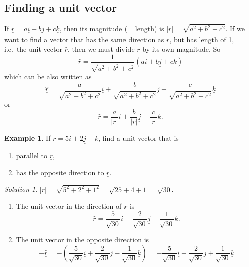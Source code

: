 \documentclass[
  english,
  11pt,
  oneside]{book}
\providecommand{\tightlist}{%
  \setlength{\itemsep}{0pt}\setlength{\parskip}{0pt}}
\newcommand{\slide}{}
\theoremstyle{definition}
\theoremstyle{definition}
\newtheorem{example}{Example}[chapter]
\theoremstyle{definition}
\theoremstyle{definition}
\theoremstyle{remark}
\newtheorem*{solution}{Solution}
\begin{document}
\subsection{Finding a unit vector}\label{finding-a-unit-vector}

If \(\underline r = a\underline i + b\underline j + c\underline k\), then its magnitude (= length) is \(|r| = \sqrt{a^2+b^2+c^2}\). If we want to find a vector that has the same direction as \(\underline r\), but has length of 1, i.e.~the unit vector \(\underline{\hat r}\), then we must divide \(\underline r\) by its own magnitude. So
\[
\underline{\hat r} = \frac{1}{\sqrt{a^2+b^2+c^2}}(a\underline i+b\underline j+c\underline k)
\]
which can be also written as
\[
\underline{\hat r} = \frac{a}{\sqrt{a^2+b^2+c^2}}\underline i+\frac{b}{\sqrt{a^2+b^2+c^2}}\underline j+\frac{c}{\sqrt{a^2+b^2+c^2}}\underline k
\]
or
\[
\underline{\hat r} = \frac{a}{|\underline r|}\underline i+\frac{b}{|\underline r|}\underline j+\frac{c}{|\underline r|}\underline k.
\]
\slide

\begin{example}

If \(\underline r = 5\underline i+2\underline j-\underline k\), find a unit vector that is

\begin{enumerate}
\def\labelenumi{\alph{enumi}.}
\tightlist
\item
  parallel to \(\underline r\),
\item
  has the opposite direction to \(\underline r\).
\end{enumerate}

\end{example}

\begin{solution}

\(|\underline r| = \sqrt{5^2+2^2+1^2} = \sqrt{25+4+1} = \sqrt{30}\).

\begin{enumerate}
\def\labelenumi{\alph{enumi}.}
\tightlist
\item
  The unit vector in the direction of \(\underline r\) is
  \[
  \underline{\hat r} = \frac5{\sqrt{30}}\underline i+\frac2{\sqrt{30}}\underline j-\frac1{\sqrt{30}}\underline k.
  \]
\item
  The unit vector in the opposite direction is
  \[
  -\underline{\hat r} = -\left(\frac{5}{\sqrt{30}}\underline i+\frac{2}{\sqrt{30}}\underline j-\frac{1}{\sqrt{30}}\underline k\right) = -\frac{5}{\sqrt{30}}\underline i-\frac{2}{\sqrt{30}}\underline j+\frac{1}{\sqrt{30}}\underline k
  \]
\end{enumerate}

\end{solution}
\end{document}
